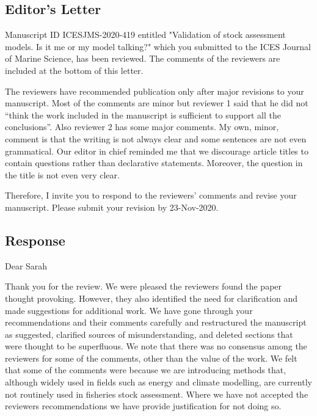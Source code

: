 \subsection*{Editor's Letter}

Manuscript ID ICESJMS-2020-419 entitled "Validation of stock assessment models. Is it me or my model talking?" which you submitted to the ICES Journal of Marine Science, has been reviewed.  The comments of the reviewers are included at the bottom of this letter. 

The reviewers have recommended publication only after major revisions to your manuscript. Most of the comments are minor but reviewer 1 said that he did not “think the work included in the manuscript is sufficient to support all the conclusions”. Also reviewer 2 has some major comments. My own, minor, comment is that the writing is not always clear and some sentences are not even grammatical. Our editor in chief reminded me that we discourage article titles to contain questions rather than declarative statements. Moreover, the question in the title is not even very clear. 

Therefore, I invite you to respond to the reviewers' comments and revise your manuscript. Please submit your revision by 23-Nov-2020.

\subsection*{Response}

Dear Sarah

Thank you for the review. We were pleased the reviewers found the paper thought provoking. However, they also identified the need for clarification and made suggestions for additional work. We have gone through your recommendations and their comments carefully and restructured the manuscript as suggested, clarified sources of misunderstanding, and deleted sections that were thought to be superfluous. We note that there was no consensus among the reviewers for some of the comments, other than the value of the work. We felt that some of the comments were because we are introducing methods that, although widely used in fields such as energy and climate modelling, are currently not routinely used in fisheries stock assessment.  Where we have not accepted the reviewers recommendations we have provide justification for not doing so. 

